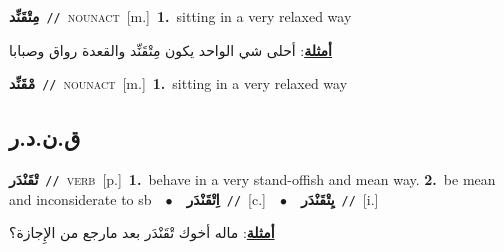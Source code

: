 \documentclass[10pt,a4paper,twoside]{article} %
\begin{document}
\begin{multicols}{2}
{\setlength\topsep{0pt}\textbf{\foreignlanguage{arabic}{مِتْقَنِّد}}\ {\color{gray}\texttt{//}\color{black}}\ \textsc{noun\textunderscore act}\ [m.]\ \textbf{1.}~sitting in a very relaxed way\  \begin{flushright}\color{gray}\foreignlanguage{arabic}{\textbf{\underline{\foreignlanguage{arabic}{أمثلة}}}: أحلى شي الواحد يكون مِتْقَنِّد والقعدة رواق وصبابا}\end{flushright}\color{black}} \vspace{2mm}

{\setlength\topsep{0pt}\textbf{\foreignlanguage{arabic}{مْقَنِّد}}\ {\color{gray}\texttt{//}\color{black}}\ \textsc{noun\textunderscore act}\ [m.]\ \textbf{1.}~sitting in a very relaxed way\ } \vspace{2mm}

\vspace{-3mm}
\subsection*{\color{blue}\foreignlanguage{arabic}{ق.ن.د.ر}\color{blue}{}} 

{\setlength\topsep{0pt}\textbf{\foreignlanguage{arabic}{تْقَنْدَر}}\ {\color{gray}\texttt{//}\color{black}}\ \textsc{verb}\ [p.]\ \textbf{1.}~behave in a very stand-offish and mean way.  \textbf{2.}~be mean and inconsiderate to sb\ \ $\bullet$\ \ \setlength\topsep{0pt}\textbf{\foreignlanguage{arabic}{اِتْقَنْدَر}}\ {\color{gray}\texttt{//}\color{black}}\ [c.]\ \ $\bullet$\ \ \setlength\topsep{0pt}\textbf{\foreignlanguage{arabic}{يِتْقَنْدَر}}\ {\color{gray}\texttt{//}\color{black}}\ [i.]\  \begin{flushright}\color{gray}\foreignlanguage{arabic}{\textbf{\underline{\foreignlanguage{arabic}{أمثلة}}}: ماله أخوك تْقَنْدَر بعد مارجع من الإِجازة؟}\end{flushright}\color{black}} \vspace{2mm}


\end{multicols}
\end{document}
